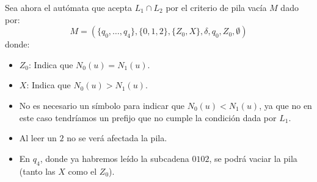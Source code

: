 \begin{ejercicio}
    Sea ahora el autómata que acepta $L_1\cap L_2$ por el criterio de pila vacía $M$ dado por:
    \begin{equation*}
        M = (\{q_0,\ldots,q_4\},\{0,1,2\},\{Z_0,X\},\delta,q_0,Z_0,\emptyset)
    \end{equation*}
    donde:
    \begin{itemize}
        \item $Z_0$: Indica que $N_0(u)=N_1(u)$.
        \item $X$: Indica que $N_0(u)>N_1(u)$.
        \item No es necesario un símbolo para indicar que $N_0(u)<N_1(u)$, ya que no en este caso tendríamos un prefijo que no cumple la condición dada por $L_1$.
        \item Al leer un $2$ no se verá afectada la pila.
        \item En $q_4$, donde ya habremos leído la subcadena $0102$, se podrá vaciar la pila (tanto las $X$ como el $Z_0$).
    \end{itemize}


\end{ejercicio}
